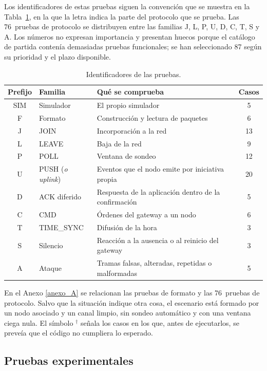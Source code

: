 Los identificadores de estas pruebas siguen la convención que se muestra en la Tabla~\ref{tab:nomenclatura}, en la que la letra indica la parte del protocolo que se prueba. Las 76~pruebas de protocolo se distribuyen entre las familias J, L, P, U, D, C, T, S y A. Los números no expresan importancia y presentan huecos porque el catálogo de partida contenía demasiadas pruebas funcionales; se han seleccionado 87 según su prioridad y el plazo disponible.

\begin{table}[H]
\centering
\caption{\label{tab:nomenclatura} Identificadores de las pruebas.}
\begin{tabular}{|c|p{2.9cm}|p{7.0cm}|c|}
\hline
\textbf{Prefijo} & \textbf{Familia} & \textbf{Qué se comprueba} & \textbf{Casos} \\
\hline
SIM & Simulador & El propio simulador & 5 \\
\hline
F & Formato & Construcción y lectura de paquetes & 6 \\
\hline
J & JOIN & Incorporación a la red & 13 \\
\hline
L & LEAVE & Baja de la red & 9 \\
\hline
P & POLL & Ventana de sondeo & 12 \\
\hline
U & PUSH (\textit{o uplink}) & Eventos que el nodo emite por iniciativa propia & 20 \\
\hline
D & ACK diferido & Respuesta de la aplicación dentro de la confirmación & 5 \\
\hline
C & CMD & Órdenes del gateway a un nodo & 6 \\
\hline
T & TIME\_SYNC & Difusión de la hora & 3 \\
\hline
S & Silencio & Reacción a la ausencia o al reinicio del gateway & 3 \\
\hline
A & Ataque & Tramas falsas, alteradas, repetidas o malformadas & 5 \\
\hline
\end{tabular}
\end{table}

En el Anexo \ref{anexo_A} se relacionan las pruebas de formato y las 76~pruebas de protocolo. Salvo que la situación indique otra cosa, el escenario está formado por un nodo asociado y un canal limpio, sin sondeo automático y con una ventana ciega nula. El símbolo $^{\dagger}$ señala los casos en los que, antes de ejecutarlos, se preveía que el código no cumpliera lo esperado.

\subsection{Pruebas experimentales}\label{sec:experimentos}

